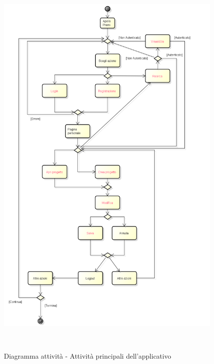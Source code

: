 \begin{figure}[p] 
	\centering 
	\includegraphics[height=20cm, keepaspectratio] {img/activity_diagram.png}
	\caption{Diagramma attività - Attività principali dell'applicativo \PROGETTO} 
\end{figure}

\newpage

